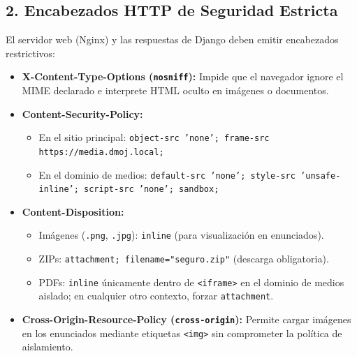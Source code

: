\documentclass[11pt,a4paper]{article}
\begin{document}
\subsection{2. Encabezados HTTP de Seguridad Estricta}
El servidor web (Nginx) y las respuestas de Django deben emitir encabezados restrictivos:
\begin{itemize}
    \item \textbf{X-Content-Type-Options (\texttt{nosniff}):} Impide que el navegador ignore el MIME declarado e interprete HTML oculto en imágenes o documentos.
    \item \textbf{Content-Security-Policy:}
    \begin{itemize}
        \item En el sitio principal: \texttt{object-src 'none'; frame-src https://media.dmoj.local;}
        \item En el dominio de medios: \texttt{default-src 'none'; style-src 'unsafe-inline'; script-src 'none'; sandbox;}
    \end{itemize}
    \item \textbf{Content-Disposition:}
    \begin{itemize}
        \item Imágenes (\texttt{.png}, \texttt{.jpg}): \texttt{inline} (para visualización en enunciados).
        \item ZIPs: \texttt{attachment; filename="seguro.zip"} (descarga obligatoria).
        \item PDFs: \texttt{inline} únicamente dentro de \texttt{\textless iframe\textgreater} en el dominio de medios aislado; en cualquier otro contexto, forzar \texttt{attachment}.
    \end{itemize}
    \item \textbf{Cross-Origin-Resource-Policy (\texttt{cross-origin}):} Permite cargar imágenes en los enunciados mediante etiquetas \texttt{\textless img\textgreater} sin comprometer la política de aislamiento.
\end{itemize}
\end{document}
